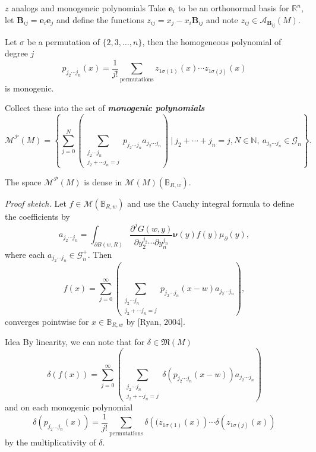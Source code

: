 \documentclass[aspectratio=169,handout]{beamer}
\newcommand\boldgreen[1]{\textcolor{lighter_csu_green}{\emph{\textbf{#1}}}}
\newcommand{\R}{\mathbb{R}}
\newcommand{\algebra}{\mathcal{A}}
\newcommand{\G}{\mathcal{G}}
\newcommand{\characters}{\mathfrak{M}}
\newcommand{\monogenics}{\mathcal{M}}
\newcommand{\ball}{\mathbb{B}}
\newcommand{\blade}[1]{\boldsymbol{#1}}
\newcommand{\normal}{\blade{\nu}}
\newcommand{\monogenicfields}[1]{\mathcal{M}^{#1}(M)}
\newcommand{\bivector}{\blade{B}}
\begin{document}
\begin{frame}{$z$ analogs and monogeneic polynomials}
Take $\blade{e}_i$ to be an orthonormal basis for $\R^n$, let $\bivector_{ij}=\blade{e}_i\blade{e}_j$ and define the functions $z_{ij}=x_j-x_i \bivector_{ij}$ and note $z_{ij} \in \algebra_{\bivector_{ij}}(M)$. 

Let $\sigma$ be a permutation of $\{2,3,\dots,n\}$, then the homogeneous polynomial of degree $j$
\[
p_{j_2\cdots j_n}(x) = \frac{1}{j!} \sum_{\textrm{permutations}} z_{1\sigma(1)}(x)\cdots z_{1\sigma(j)}(x)
\]
is monogenic.

Collect these into the set of \boldgreen{monogenic polynomials}
\[
    \monogenics^\mathcal{P}(M) = \left\{\sum_{j=0}^N \left(\sum_{\substack{{j_2 \cdots j_n} \\ {j_2 + \cdots j_n = j}}}p_{j_2 \cdots j_n}a_{j_2 \cdots j_n}\right) ~\vert~ j_2+\cdots+j_n = j, N\in \mathbb{N}, ~ a_{j_2\cdots j_n} \in \G_n\right\}.
\]
\end{frame}

\begin{frame}{}
\vfill
\begin{lemma}[Density]
The space $\monogenics^\mathcal{P}(M)$ is dense in $\monogenicfields{}(\ball_{R,w})$.
\end{lemma}
\emph{Proof sketch.} Let $f \in \monogenics{}(\ball_{R,w})$ and use the Cauchy integral formula to define the coefficients by
\[
a_{j_2 \cdots j_n} = \int_{\partial B(w,R)} \frac{\partial^j G(w,y)}{\partial y_2^{j_2} \cdots \partial y_n^{j_n}} \normal(y) f(y) \mu_\partial(y),
\]
where each $a_{j_2\cdots j_n} \in \G_n^+$. Then 
\[
f(x) = \sum_{j=0}^\infty \left(\sum_{\substack{{j_2 \cdots j_n} \\ {j_2 + \cdots j_n = j}}} p_{j_2 \cdots j_n} (x-w) a_{j_2 \cdots j_n} \right),
\]
converges pointwise for $x\in \ball_{R,w}$ by [Ryan, 2004].
\vfill
\end{frame}

\begin{frame}{Idea}
\vfill
By linearity, we can note that for $\delta \in \characters(M)$
\[
\delta(f(x)) = \sum_{j=0}^\infty \left(\sum_{\substack{{j_2 \cdots j_n} \\ {j_2 + \cdots j_n = j}}} \delta(p_{j_2 \cdots j_n} (x-w)) a_{j_2 \cdots j_n} \right)
\]
and on each monogenic polynomial
\[
\delta(p_{j_2 \dots j_n}(x)) = \frac{1}{j!} \sum_{\textrm{permutations}}\delta\left((z_{1\sigma(1)}(x)\right) \cdots \delta\left(z_{1\sigma(j)}(x)\right)
\]
by the multiplicativity of $\delta$.
\vfill
\end{frame}
\end{document}

